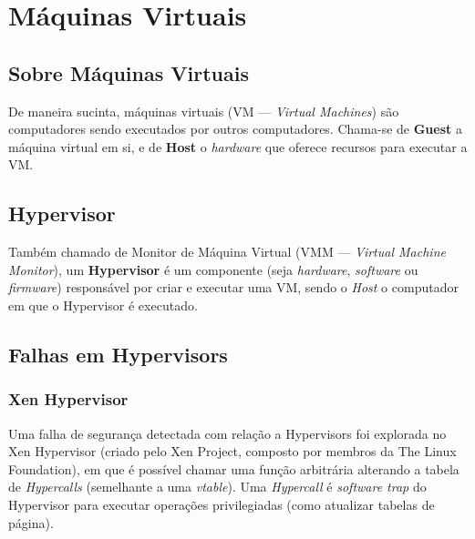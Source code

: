\documentclass{report}
\title{\todo{A gente descobre depois}}
\author{João Gabriel Trombeta\\
        João Paulo Taylor Ienczak Zanette\\
        Ranieri Schroeder Althoff}
\date{\today}
\begin{document}
\maketitle

\tableofcontents

\chapter{Máquinas Virtuais}

\section{Sobre Máquinas Virtuais}

De maneira sucinta, máquinas virtuais (VM --- \textit{Virtual Machines}) são
computadores sendo executados por outros computadores. Chama-se de
\textbf{Guest} a máquina virtual em si, e de \textbf{Host} o \textit{hardware}
que oferece recursos para executar a VM\@.

\section{Hypervisor}

Também chamado de Monitor de Máquina Virtual (VMM --- \textit{Virtual Machine
Monitor}), um \textbf{Hypervisor} é um componente (seja \textit{hardware},
\textit{software} ou \textit{firmware}) responsável por criar e executar uma
VM, sendo o \textit{Host} o computador em que o Hypervisor é executado.

\section{Falhas em Hypervisors}

\subsection{Xen Hypervisor}

Uma falha de segurança detectada com relação a Hypervisors foi explorada no Xen
Hypervisor (criado pelo Xen Project, composto por membros da The Linux
Foundation), em que é possível chamar uma função arbitrária alterando a tabela
de \textit{Hypercalls} (semelhante a uma \textit{vtable}). Uma
\textit{Hypercall} é \textit{software trap} do Hypervisor para executar
operações privilegiadas (como atualizar tabelas de página).
\end{document}
